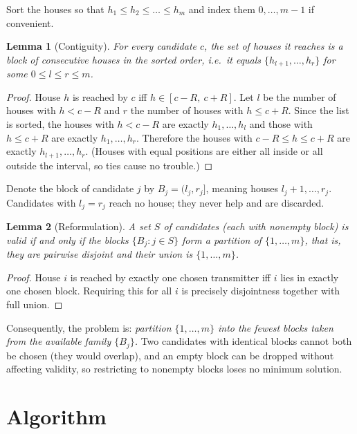 \documentclass[11pt,a4paper]{article}
\newtheorem{lemma}{Lemma}
\theoremstyle{definition}
\begin{document}
Sort the houses so that $h_1 \le h_2 \le \dots \le h_m$ and index them $0,\dots,m-1$ if convenient.

\begin{lemma}[Contiguity]\label{lem:contig}
For every candidate $c$, the set of houses it reaches is a block of consecutive houses in the sorted order, i.e.\ it equals $\{h_{l+1},\dots,h_r\}$ for some $0 \le l \le r \le m$.
\end{lemma}

\begin{proof}
House $h$ is reached by $c$ iff $h \in [c-R,\ c+R]$. Let $l$ be the number of houses with $h < c-R$ and $r$ the number of houses with $h \le c+R$.
Since the list is sorted, the houses with $h<c-R$ are exactly $h_1,\dots,h_l$ and those with $h \le c+R$ are exactly $h_1,\dots,h_r$.
Therefore the houses with $c-R \le h \le c+R$ are exactly $h_{l+1},\dots,h_r$. (Houses with equal positions are either all inside or all outside the interval, so ties cause no trouble.)
\end{proof}

Denote the block of candidate $j$ by $B_j = (l_j, r_j]$, meaning houses $l_j+1,\dots,r_j$.
Candidates with $l_j = r_j$ reach no house; they never help and are discarded.

\begin{lemma}[Reformulation]\label{lem:reform}
A set $S$ of candidates (each with nonempty block) is valid if and only if the blocks $\{B_j : j \in S\}$ form a partition of $\{1,\dots,m\}$, that is, they are pairwise disjoint and their union is $\{1,\dots,m\}$.
\end{lemma}

\begin{proof}
House $i$ is reached by exactly one chosen transmitter iff $i$ lies in exactly one chosen block. Requiring this for all $i$ is precisely disjointness together with full union.
\end{proof}

Consequently, the problem is: \emph{partition $\{1,\dots,m\}$ into the fewest blocks taken from the available family $\{B_j\}$.}
Two candidates with identical blocks cannot both be chosen (they would overlap), and an empty block can be dropped without affecting validity, so restricting to nonempty blocks loses no minimum solution.

\section{Algorithm}
\end{document}
